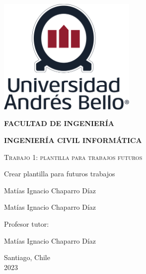 \begin{titlepage}
    \centering
    {\includegraphics[width=0.5\textwidth]{imgs/unabLogos/unabFrontPageLogo.png}\par}
    \vspace{1cm}
    {\textbf{FACULTAD DE INGENIERÍA}\par}
    {\textbf{INGENIERÍA CIVIL INFORMÁTICA} \par}
    \vspace{1cm}
    {\scshape\Huge Trabajo 1: plantilla para trabajos futuros\par}
    \vspace{2cm}
    {\LARGE Crear plantilla para futuros trabajos\par}
    \vfill
    {\Large Matías Ignacio Chaparro Díaz \par}
    {\Large Matías Ignacio Chaparro Díaz \par}
    \vfill
    {\Large Profesor tutor: \par}
    {\Large Matías Ignacio Chaparro Díaz\par}
    \vspace{1cm}
    \vfill
    {\Large Santiago, Chile \\ 2023 \par}
\end{titlepage}
 